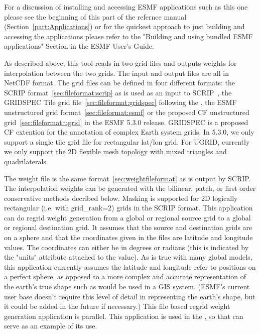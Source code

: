 For a discussion of installing and accessing ESMF applications such as this one please see the beginning of this part of the refernce manual (Section~\ref{part:Applications}) or for the quickest approach to just building and accessing the applications please refer to the "Building and using bundled ESMF applications" Section in the ESMF User's Guide.

As described above, this tool reads in
two grid files and outputs weights for interpolation
between the two grids. The input and output files are all in NetCDF format. The grid files can be defined in four
different formats:  the SCRIP format~\ref{sec:fileformat:scrip} as is used as an input to SCRIP~\cite{ref:SCRIP}, the GRIDSPEC Tile grid file~\ref{sec:fileformat:gridspec} following the
, 
the ESMF unstructured grid format~\ref{sec:fileformat:esmf} or the proposed CF unstructured grid~\ref{sec:fileformat:ugrid} 
in the ESMF 5.3.0 release.  GRIDSPEC is a proposed CF extention for the annotation of complex
Earth system grids.  In 5.3.0, we only support a single tile grid file for rectangular lat/lon grid.  For UGRID, currently we only support the 2D flexible mesh topology with mixed triangles and quadrilaterals.

The weight file is the same format~\ref{sec:weightfileformat} as is 
output by SCRIP. The interpolation weights can be generated with
the bilinear, patch, or first order conservative methods decribed below. Masking is supported for 2D logically rectangular (i.e. with grid\_rank=2) grids in the SCRIP format. This application 
can do regrid weight generation from a global or regional source grid to a global or regional destination grid.
It assumes that the source and destination grids are on a sphere and that the coordinates given in 
the files are latitude and longitude values. The coordinates can either be in degrees or radians (this is indicated by the "units" attribute attached to the value). 
As is true with many global models, this application currently assumes the latitude and longitude refer to positions on a perfect sphere, as opposed to a more complex 
and accurate representation of the earth's true shape such as would be used in a GIS system. (ESMF's current user base doesn't require this level of detail in representing the earth's shape, but it could be added in the future if necessary.)  This file based regrid weight generation application 
is parallel. This application is used in the
, so that can serve as an example of its use.


